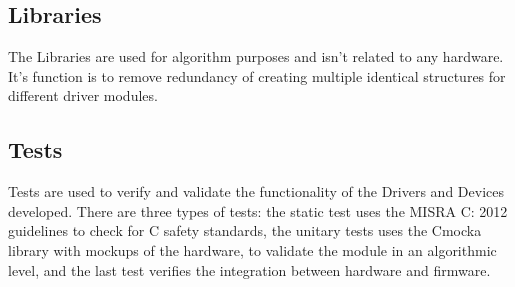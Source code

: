 \subsection{Libraries}

The Libraries are used for algorithm purposes and isn't related to any hardware. It's function is to remove redundancy of creating multiple identical structures for different driver modules.

\subsection{Tests}

Tests are used to verify and validate the functionality of the Drivers and Devices developed. There are three types of tests: the static test uses the MISRA C: 2012 \cite{misra} guidelines to check for C safety standards, the unitary tests uses the Cmocka library \cite{cmocka} with mockups of the hardware, to validate the module in an algorithmic level, and the last test verifies the integration between hardware and firmware.